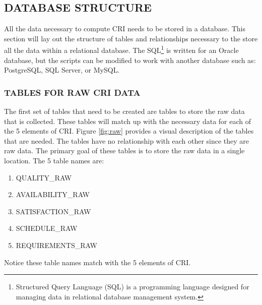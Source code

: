 \documentclass[SDSUThesis.tex]{subfiles}
\begin{document}
    \subsection{DATABASE STRUCTURE}
        All the data necessary to compute CRI needs to be stored in a database.  This section will 
        lay out the structure of tables and relationships necessary to the store all the data
        within a relational database.  The SQL\footnote{Structured Query Language (SQL) is 
        a programming language designed for managing data in relational database 
        management system.} 
        is written for an Oracle
        database, but the scripts can be modified to work with another database
        such as: PostgreSQL, SQL Server, or MySQL.  
        
        \subsubsection{TABLES FOR RAW CRI DATA}
        
            The first set of tables that need to be created are tables
            to store the raw data that is collected.  These tables
            will match up with the necessary data for each of the 5 elements
            of CRI.  Figure \ref{fig:raw} provides a visual description
            of the tables that are needed.  The tables have no relationship
            with each other since they are raw data.  The primary goal of
            these tables is to store the raw data in a single location. The
            5 table names are:
            \begin{enumerate}
                \item QUALITY\_RAW
                \item AVAILABILITY\_RAW
                \item SATISFACTION\_RAW
                \item SCHEDULE\_RAW
                \item REQUIREMENTS\_RAW
            \end{enumerate}
            Notice these table names match with the 5 elements of CRI.
        
\end{document}
